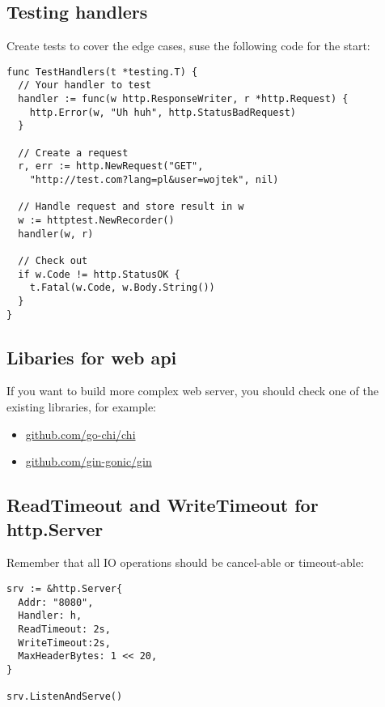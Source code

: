 \documentclass[11pt, letterpaper]{article}
\begin{document}
\subsection{Testing handlers}

Create tests to cover the edge cases, suse the following code for the start:

\begin{verbatim}
func TestHandlers(t *testing.T) {
  // Your handler to test
  handler := func(w http.ResponseWriter, r *http.Request) {
    http.Error(w, "Uh huh", http.StatusBadRequest)
  }

  // Create a request
  r, err := http.NewRequest("GET",
    "http://test.com?lang=pl&user=wojtek", nil)

  // Handle request and store result in w
  w := httptest.NewRecorder()
  handler(w, r)

  // Check out
  if w.Code != http.StatusOK {
    t.Fatal(w.Code, w.Body.String())
  }
}
\end{verbatim}

\subsection{Libaries for web api}

If you want to build more complex web server, you should check one of the existing libraries, for example: \begin{itemize}
\item \href{https://github.com/go-chi/chi}{github.com/go-chi/chi}
\item \href{https://github.com/gin-gonic/gin}{github.com/gin-gonic/gin}
\end{itemize}

\subsection{ReadTimeout and WriteTimeout for http.Server}
Remember that all {\small IO} operations should be cancel-able or timeout-able:

\begin{verbatim}
srv := &http.Server{
  Addr: "8080",
  Handler: h,
  ReadTimeout: 2s,
  WriteTimeout:2s,
  MaxHeaderBytes: 1 << 20,
}

srv.ListenAndServe()
\end{verbatim}
\end{document}
